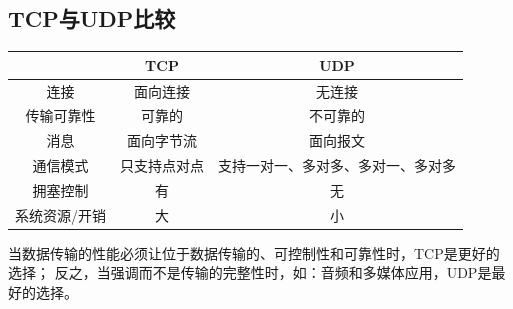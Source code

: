 \subsection{TCP与UDP比较}
\begin{center}
\begin{tabular}{|c|c|c|}\hline
 & TCP & UDP\\\hline
连接 & 面向连接 & 无连接\\\hline
传输可靠性 & 可靠的 & 不可靠的\\\hline
消息 & 面向字节流 & 面向报文\\\hline
通信模式 & 只支持点对点 & 支持一对一、多对多、多对一、多对多\\\hline
拥塞控制 & 有 & 无\\\hline
系统资源/开销 & 大 & 小\\\hline
\end{tabular}
\end{center}

当数据传输的性能必须让位于数据传输的、可控制性和可靠性时，TCP是更好的选择；
反之，当强调而不是传输的完整性时，如：音频和多媒体应用，UDP是最好的选择。